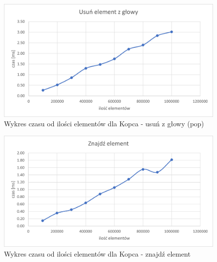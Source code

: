 \documentclass{article}
\begin{document}
    \begin{figure}[H]
        \centering
        \includegraphics[scale = 0.85]{wykresy/heap/pop.png}
        \caption{Wykres czasu od ilości elementów dla Kopca - usuń z głowy (pop)}
    \end{figure}
    
    \begin{figure}[H]
        \centering
        \includegraphics[scale = 0.85]{wykresy/heap/find.png}
        \caption{Wykres czasu od ilości elementów dla Kopca - znajdź element}
    \end{figure}  
\end{document}
